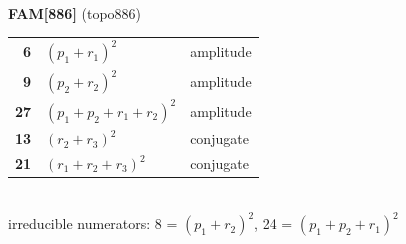 \documentclass[10pt]{article}
\begin{document}
\begin{minipage}[t]{0.48\textwidth}
{}\\[2mm]\textbf{FAM[886]} (topo886)\\[2pt]{\footnotesize\begin{tabular}{@{}r@{\ \ }l@{\ \ }l@{}}\textbf{6} & $(p_1+r_1)^2$ & amplitude\\
\textbf{9} & $(p_2+r_2)^2$ & amplitude\\
\textbf{27} & $(p_1+p_2+r_1+r_2)^2$ & amplitude\\
\textbf{13} & $(r_2+r_3)^2$ & conjugate\\
\textbf{21} & $(r_1+r_2+r_3)^2$ & conjugate\\\end{tabular}}\\[2pt]{\scriptsize irreducible numerators: 8 = $(p_1+r_2)^2$, 24 = $(p_1+p_2+r_1)^2$}\end{minipage}\hfill%
\end{document}
